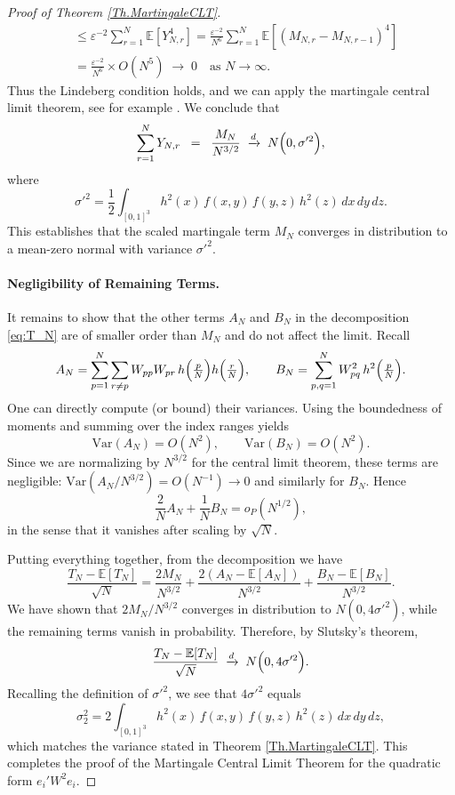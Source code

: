 \documentclass[11pt, reqno]{amsart}
\numberwithin{equation}{section}
\begin{document}
\begin{proof}[Proof of Theorem \ref{Th.MartingaleCLT}]
\[\begin{aligned}
&\le \varepsilon^{-2} \sum_{r=1}^{N} \mathbb{E}[Y_{N,r}^4] 
= \frac{\varepsilon^{-2}}{N^6}\sum_{r=1}^N \mathbb{E}[(M_{N,r}-M_{N,r-1})^4] \\
&= \frac{\varepsilon^{-2}}{N^6} \times O(N^5) \;\longrightarrow\; 0
\quad\text{as } N\to\infty.
\end{aligned}
\]
Thus the Lindeberg condition holds, and we can apply the martingale central limit theorem, see for example \cite[Theorem 35.12]{billingsley2017probability}.  We conclude that
\[
\sum_{r=1}^N Y_{N,r} \;\;=\;\; \frac{M_N}{N^{3/2}}
\;\xrightarrow{d}\; N\Bigl(0,\sigma'^2\Bigr),
\]
where
\[
\sigma'^2 = \frac{1}{2}\int_{[0,1]^3} h^2(x)\,f(x,y)\,f(y,z)\,h^2(z)\,dx\,dy\,dz.
\]
This establishes that the scaled martingale term $M_N$ converges in distribution to a mean-zero normal with variance $\sigma'^2$.

\paragraph{\bf Negligibility of Remaining Terms.}

It remains to show that the other terms $A_N$ and $B_N$ in the decomposition \eqref{eq:T_N} are of smaller order than $M_N$ and do not affect the limit.  Recall
\[
A_N = \sum_{p=1}^N\sum_{r\neq p}W_{pp}W_{pr}\,h\Bigl(\tfrac{p}{N}\Bigr)h\Bigl(\tfrac{r}{N}\Bigr), 
\qquad
B_N = \sum_{p,q=1}^N W_{pq}^2\,h^2\Bigl(\tfrac{p}{N}\Bigr).
\]
One can directly compute (or bound) their variances.  Using the boundedness of moments and summing over the index ranges yields
\[
\mathrm{Var}(A_N) = O(N^2),
\qquad 
\mathrm{Var}(B_N) = O(N^2).
\]
Since we are normalizing by $N^{3/2}$ for the central limit theorem, these terms are negligible: $\mathrm{Var}(A_N/N^{3/2}) = O(N^{-1}) \to 0$ and similarly for $B_N$.  Hence
\[
\frac{2}{N}A_N + \frac{1}{N}B_N
= o_{P}(N^{1/2}),
\]
in the sense that it vanishes after scaling by $\sqrt{N}$.

Putting everything together, from the decomposition we have
\[
\frac{T_N - \mathbb{E}[T_N]}{\sqrt{N}}
= \frac{2M_N}{N^{3/2}} + \frac{2(A_N - \mathbb{E}[A_N])}{N^{3/2}} + \frac{B_N - \mathbb{E}[B_N]}{N^{3/2}}.
\]
We have shown that $2M_N/N^{3/2}$ converges in distribution to $N(0,4\sigma'^2)$, while the remaining terms vanish in probability.  Therefore, by Slutsky’s theorem,
\[
\frac{T_N - \mathbb{E}[T_N]}{\sqrt{N}}
\;\xrightarrow{d}\; N\Bigl(0,4\sigma'^2\Bigr).
\]
Recalling the definition of $\sigma'^2$, we see that $4\sigma'^2$ equals
\[
\sigma_2^2 = 2\int_{[0,1]^3} h^2(x)\,f(x,y)\,f(y,z)\,h^2(z)\,dx\,dy\,dz,
\]
which matches the variance stated in Theorem \ref{Th.MartingaleCLT}.  This completes the proof of the Martingale Central Limit Theorem for the quadratic form $e_i' W^2 e_i$.

\end{proof}
\end{document}
